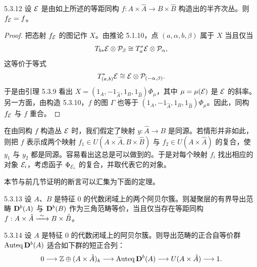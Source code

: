 \begin{proposition}{5.3.12}
设 $\mathcal{E}$ 是由如上所述的等距同构 $f:A\times\hat A\to B\times\hat B$ 构造出的半齐次丛。则 $f_{\mathcal{E}}=f$。
\end{proposition}

\begin{proof}
把态射 $f_{\mathcal{E}}$ 的图记作 $X$。由推论 5.1.10，点 $(a,\alpha,b,\beta)$ 属于 $X$ 当且仅当
\begin{equation*}
T_{b*}\mathcal{E}\otimes\mathcal{P}_\beta\cong T^*_a\mathcal{E}\otimes\mathcal{P}_\alpha,
\end{equation*}
这等价于等式
\begin{equation*}
T^*_{(a,b)}\mathcal{E}\cong\mathcal{E}\otimes\mathcal{P}_{(-\alpha,\beta)}.
\end{equation*}
于是由引理 5.3.9 看出 $X=(1_A,-1_{\hat A},1_B,1_{\hat B})\Phi_\mu$，其中 $\mu=\mu(\mathcal{E})$ 是 $\mathcal{E}$ 的斜率。另一方面，由构造 5.3.10，$f$ 的图 $\Gamma$ 也等于 $(1_A,-1_{\hat A},1_B,1_{\hat B})\Phi_\mu$。因此，同构 $f_{\mathcal{E}}$ 与 $f$ 重合。
\end{proof}

在由同构 $f$ 构造丛 $\mathcal{E}$ 时，我们假定了映射 $y:\hat A\to B$ 是同源。若情形并非如此，则把 $f$ 表示成两个映射 $f_1\in U(A\times\hat A,B\times\hat B)$ 与 $f_2\in U(A\times\hat A)$ 的复合，使 $y_1$ 与 $y_2$ 都是同源。容易看出这总是可以做到的。于是对每个映射 $f_i$ 找出相应的对象 $\mathcal{E}_i$，考虑函子 $\Phi_{\mathcal{E}_i}$ 的复合，并取代表它的对象。

本节与前几节证明的断言可以汇集为下面的定理。

\begin{theorem}{5.3.13}
设 $A$、$B$ 是特征 $0$ 的代数闭域上的两个阿贝尔簇。则凝聚层的有界导出范畴 $\mathbf{D}^{b}(A)$ 与 $\mathbf{D}^{b}(B)$ 作为三角范畴等价，当且仅当存在等距同构 $f:A\times\hat A\xrightarrow{\ \sim\ } B\times\hat B$。
\end{theorem}

\begin{theorem}{5.3.14}
设 $A$ 是特征 $0$ 的代数闭域上的阿贝尔簇。则导出范畴的正合自等价群 $\operatorname{Auteq}\mathbf{D}^{b}(A)$ 适合如下群的短正合列：
\begin{equation*}
0\longrightarrow\mathbb{Z}\oplus(A\times\hat A)_k\longrightarrow\operatorname{Auteq}\mathbf{D}^{b}(A)\longrightarrow U(A\times\hat A)\longrightarrow 1.
\end{equation*}
\end{theorem}


